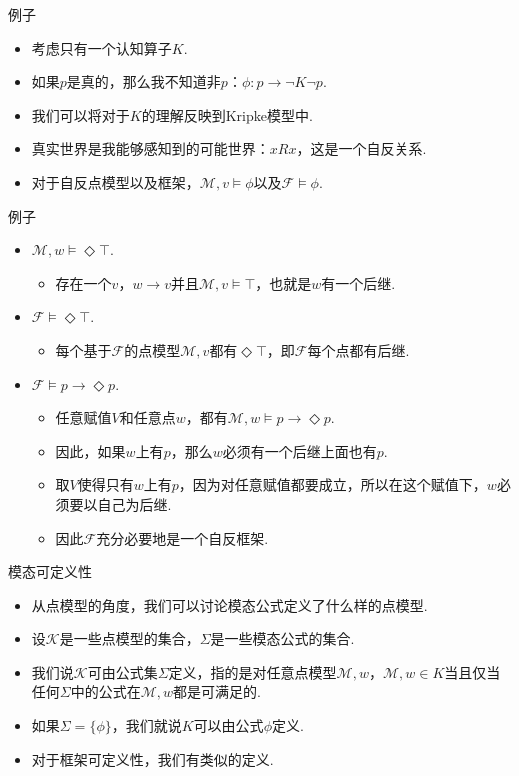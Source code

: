 \begin{frame}{例子}
\begin{itemize}
    \item 考虑只有一个认知算子$K$.
    \item 如果$p$是真的，那么我不知道非$p$：$\phi:p\to\neg K\neg p$.
    \item 我们可以将对于$K$的理解反映到Kripke模型中.
    \item 真实世界是我能够感知到的可能世界：$xRx$，这是一个自反关系.
    \item 对于自反点模型以及框架，$\mathcal M,v\vDash \phi$以及$\mathcal F\vDash \phi$.
\end{itemize}
\end{frame}

\begin{frame}{例子}
\begin{itemize}
    \item $\mathcal M,w\vDash\Diamond\top$.
    \begin{itemize}
        \item 存在一个$v$，$w\to v$并且$\mathcal M,v\vDash\top$，也就是$w$有一个后继.
    \end{itemize}
    \item $\mathcal F\vDash\Diamond \top$.
    \begin{itemize}
        \item 每个基于$\mathcal F$的点模型$\mathcal M,v$都有$\Diamond \top$，即$\mathcal F$每个点都有后继.
    \end{itemize}
    \item $\mathcal F\vDash p\to\Diamond p$.
    \begin{itemize}
        \item 任意赋值$V$和任意点$w$，都有$\mathcal M,w\vDash p\to\Diamond p$.
        \item 因此，如果$w$上有$p$，那么$w$必须有一个后继上面也有$p$.
        \item  取$V$使得只有$w$上有$p$，因为对任意赋值都要成立，所以在这个赋值下，$w$必须要以自己为后继.
        \item 因此$\mathcal F$充分必要地是一个自反框架.
    \end{itemize}
\end{itemize}
\end{frame}

\begin{frame}{模态可定义性}
\begin{itemize}
    \item 从点模型的角度，我们可以讨论模态公式定义了什么样的点模型.
    \item 设$\mathcal K$是一些点模型的集合，$\Sigma$是一些模态公式的集合.
    \item 我们说$\mathcal K$可由公式集$\Sigma$定义，指的是对任意点模型$\mathcal M,w$，$\mathcal M,w\in K$当且仅当任何$\Sigma$中的公式在$\mathcal M,w$都是可满足的.
    \item 如果$\Sigma=\{\phi\}$，我们就说$K$可以由公式$\phi$定义.
    \item 对于框架可定义性，我们有类似的定义.
\end{itemize}
\end{frame}

